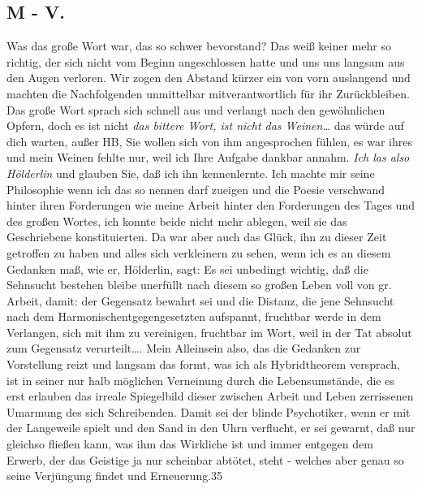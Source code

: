 \documentclass[
]{article}
\author{}
\date{\vspace{-2.5em}}
\begin{document}
\subsection{M - V.}\label{m---v.}

Was das große Wort war, das so schwer bevorstand? Das weiß keiner mehr
so richtig, der sich nicht vom Beginn angeschlossen hatte und uns uns
langsam aus den Augen verloren. Wir zogen den Abstand kürzer ein von
vorn auslangend und machten die Nachfolgenden unmittelbar
mitverantwortlich für ihr Zurückbleiben. Das große Wort sprach sich
schnell aus und verlangt nach den gewöhnlichen Opfern, doch es ist nicht
\emph{das bittere Wort, ist nicht das Weinen\ldots{}} das würde auf dich
warten, außer HB, Sie wollen sich von ihm angesprochen fühlen, es war
ihres und mein Weinen fehlte nur, weil ich Ihre Aufgabe dankbar annahm.
\emph{Ich las also Hölderlin }und glauben Sie, daß ich ihn kennenlernte.
Ich machte mir seine Philosophie wenn ich das so nennen darf zueigen und
die Poesie verschwand hinter ihren Forderungen wie meine Arbeit hinter
den Forderungen des Tages und des großen Wortes, ich konnte beide nicht
mehr ablegen, weil sie das Geschriebene konstituierten. Da war aber auch
das Glück, ihn zu dieser Zeit getroffen zu haben und alles sich
verkleinern zu sehen, wenn ich es an diesem Gedanken maß, wie er,
Hölderlin, sagt: Es sei unbedingt wichtig, daß die Sehnsucht bestehen
bleibe unerfüllt nach diesem so großen Leben voll von gr. Arbeit, damit:
der Gegensatz bewahrt sei und die Distanz, die jene Sehnsucht nach dem
Harmonischentgegengesetzten aufspannt, fruchtbar werde in dem Verlangen,
sich mit ihm zu vereinigen, fruchtbar im Wort, weil in der Tat absolut
zum Gegensatz verurteilt\ldots. Mein Alleinsein also, das die Gedanken
zur Vorstellung reizt und langsam das formt, was ich als Hybridtheorem
versprach, ist in seiner nur halb möglichen Verneinung durch die
Lebensumstände, die es erst erlauben das irreale Spiegelbild dieser
zwischen Arbeit und Leben zerrissenen Umarmung des sich Schreibenden.
Damit sei der blinde Psychotiker, wenn er mit der Langeweile spielt und
den Sand in den Uhrn verflucht, er sei gewarnt, daß nur gleichso fließen
kann, was ihm das Wirkliche ist und immer entgegen dem Erwerb, der das
Geistige ja nur scheinbar abtötet, steht - welches aber genau so seine
Verjüngung findet und Erneuerung.35
\end{document}
